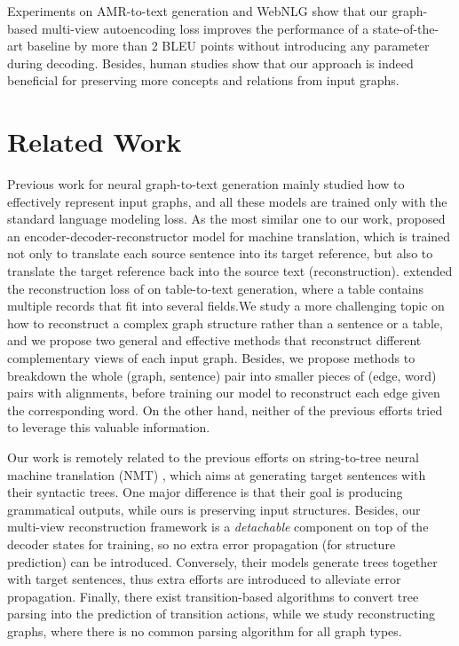 \documentclass[11pt,a4paper]{article}
\begin{document}
Experiments on AMR-to-text generation and WebNLG \citep{gardent2017webnlg} show that our graph-based multi-view autoencoding loss improves the performance of a 
state-of-the-art baseline by more than 2 BLEU points
without introducing any parameter during decoding.
Besides, human studies show that our approach is indeed beneficial for preserving more concepts and relations from input graphs.


\section{Related Work}


Previous work for neural graph-to-text generation \citep{konstas2017neural,song2018graph,beck2018graph,trisedya2018gtr,marcheggiani2018deep,xu2018sql,cao2019factorising,damonte2019structural,hajdik2019neural,koncel2019text,hong2019improving,song2019semantic,su2017lattice} mainly studied how to effectively represent input graphs, and all these models are trained only with the standard language modeling loss.
As the most similar one to our work, \citet{tu2017neural} proposed an encoder-decoder-reconstructor model for machine translation, which is trained not only to translate each source sentence into its target reference, but also to translate the target reference back into the source text (reconstruction).
\citet{wiseman2017challenges} extended 
the reconstruction loss of 
\citet{tu2017neural} on table-to-text generation, where a table contains multiple records that fit into several fields.We study a more challenging topic on how to reconstruct a complex graph structure rather than a sentence or a table, and we propose two general and effective methods that reconstruct different complementary views of each input graph.
Besides, we propose methods to breakdown the whole (graph, sentence) pair into smaller pieces of (edge, word) pairs with alignments, before training our model to reconstruct each edge given the corresponding word.
On the other hand, neither of the previous efforts tried to leverage this valuable information.


Our work is remotely related to the previous efforts on string-to-tree neural machine translation (NMT) \citep{aharoni2017towards,wu2017sequence,wang2018tree}, which aims at generating target sentences with their syntactic trees.
One major difference is that their goal is producing grammatical outputs, while ours is preserving input structures.
Besides, our multi-view reconstruction framework is a \emph{detachable} component on top of the decoder states for training, so no extra error propagation (for structure prediction) can be introduced.
Conversely, their models generate trees together with target sentences, thus extra efforts \citep{wu2017sequence} are introduced to alleviate error propagation.
Finally, there exist transition-based algorithms \citep{nivre2003efficient} to convert tree parsing into the prediction of transition actions, while
we study reconstructing graphs, where there is no common parsing algorithm for all graph types.
\end{document}
